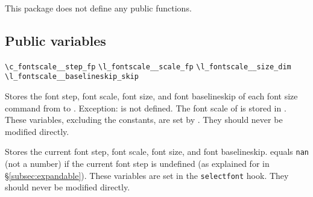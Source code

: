 \documentclass{beery}
\begin{document}
This package does not define any public  functions.

\subsection{Public variables}
\label{subsec:publicvariables}

\verb|\c_fontscale_|\verb|_step_fp|
\nopagebreak\newline
\verb|\l_fontscale_|\verb|_scale_fp|
\newline
\verb|\l_fontscale_|\verb|_size_dim|
\nopagebreak\newline
\verb|\l_fontscale_|\verb|_baselineskip_skip|

Stores the font step, font scale, font size, and font baselineskip of each font size command from  to .
Exception:
 is not defined.
The font scale of  is stored in .
These variables, excluding the constants, are set by .
They should never be modified directly.

\nopagebreak\newline
{}
\newline
{}
\nopagebreak\newline
{}

Stores the current font step, font scale, font size, and font baselineskip.
 equals \texttt{nan} (not a number) if the current font step is undefined (as explained for  in \S\ref{subsec:expandable}).
These variables are set in the \texttt{selectfont} hook.
They should never be modified directly.
\end{document}
